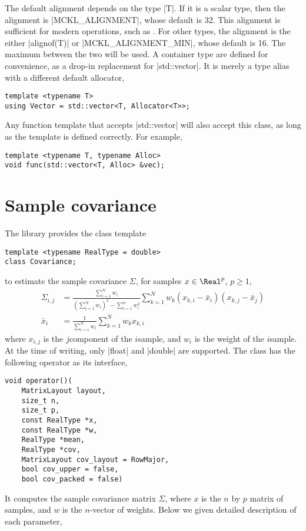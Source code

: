The default alignment depends on the type |T|. If it is a scalar type, then the
alignment is |MCKL_ALIGNMENT|, whose default is 32. This alignment is
sufficient for modern \simd operations, such as \avx. For other types, the
alignment is the either |alignof(T)| or |MCKL_ALIGNMENT_MIN|, whose default is
16. The maximum between the two will be used. A container type are defined for
convenience, as a drop-in replacement for |std::vector|. It is merely a type
alias with a different default allocator,
\begin{Verbatim}
template <typename T>
using Vector = std::vector<T, Allocator<T>>;
\end{Verbatim}
Any function template that accepts |std::vector| will also accept this class,
as long as the template is defined correctly. For example,
\begin{Verbatim}
template <typename T, typename Alloc>
void func(std::vector<T, Alloc> &vec);
\end{Verbatim}

\section{Sample covariance}
\label{sec:Sample covariance}

The library provides the class template
\begin{Verbatim}
template <typename RealType = double>
class Covariance;
\end{Verbatim}
to estimate the sample covariance $\Sigma$, for samples $x\in\Real^p$, $p\ge1$,
\begin{align*}
  \Sigma_{i,j} &= \frac{\sum_{i=1}^N w_i}
  {(\sum_{i=1}^N w_i)^2 - \sum_{i=1}^n w_i^2}
  \sum_{k=1}^N w_k (x_{k,i} - \bar{x}_i)(x_{k,j} - \bar{x}_j) \\
  \bar{x}_i &= \frac{1}{\sum_{i=1}^N w_i}\sum_{k=1}^N w_k x_{k,i}
\end{align*}
where $x_{i,j}$ is the $j$\ith component of the $i$\ith sample, and $w_i$ is
the weight of the $i$\ith sample. At the time of writing, only |float| and
|double| are supported. The class has the following operator as its interface,
\begin{Verbatim}
void operator()(
    MatrixLayout layout,
    size_t n,
    size_t p,
    const RealType *x,
    const RealType *w,
    RealType *mean,
    RealType *cov,
    MatrixLayout cov_layout = RowMajor,
    bool cov_upper = false,
    bool cov_packed = false)
\end{Verbatim}
It computes the sample covariance matrix $\Sigma$,
where $x$ is the $n$ by $p$ matrix of samples, and $w$ is the $n$-vector of
weights. Below we given detailed description of each parameter,

